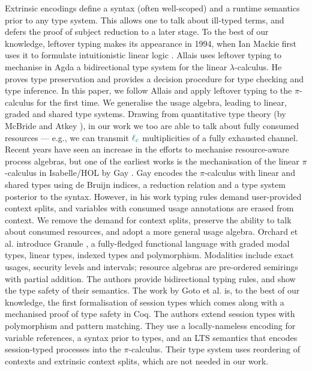 \documentclass[runningheads]{llncs}
\newcommand{\lambdacalc}{$\lambda$-calculus}
\newcommand{\picalc}{$\pi$-calculus}
\newcommand{\func}[1]{\textcolor{teal}{\operatorname{#1}}}
\newcommand{\lz}{\func{\ell_{\varepsilon}}}
\begin{document}
Extrinsic encodings define a syntax (often well-scoped) and a runtime semantics prior to any type system.
This allows one to talk about ill-typed terms, and defers the proof of subject reduction to a later stage.
%
To the best of our knowledge, leftover typing makes its appearance in 1994, when Ian Mackie first uses it to formulate intuitionistic linear logic \cite{Mackie}.
Allais \cite{Allais2018a} uses leftover typing to mechanise in Agda a bidirectional type system for the linear \lambdacalc{}.
He proves type preservation and provides a decision procedure for type checking and type inference.
In this paper, we follow Allais \cite{Allais2018a} and apply leftover typing to the \picalc{} for the first time.
We generalise the usage algebra, leading to linear, graded and shared type systems.
Drawing from quantitative type theory (by McBride and Atkey \cite{McBride2016,Atkey2018}), in our work we too are able to talk about fully consumed resources --- e.g., we can transmit $\lz$ multiplicities of a fully exhausted channel.
%
Recent years have seen an increase in the efforts to mechanise resource-aware process algebras, but one of the earliest works is the mechanisation of the linear \picalc{} in Isabelle/HOL by Gay \cite{Gay2001}.
Gay encodes the \picalc{} with linear and shared types using de Bruijn indices, a reduction relation and a type system posterior to the syntax.
However, in his work typing rules demand user-provided context splits, and variables with consumed usage annotations are erased from context.
We remove the demand for context splits, preserve the ability to talk about consumed resources, and adopt a more general usage algebra.
%
Orchard et al. introduce Granule \cite{Orchard}, a fully-fledged functional language with graded modal types, linear types, indexed types and polymorphism.
Modalities include exact usages, security levels and intervals; resource algebras are pre-ordered semirings with partial addition.
The authors provide bidirectional typing rules, and show the type safety of their semantics.
%
The work by Goto et al. \cite{Goto2016a} is, to the best of our knowledge, the first formalisation of session types which comes along with a mechanised proof of type safety in Coq.
The authors extend session types with polymorphism and pattern matching.
They use a locally-nameless encoding for variable references, a syntax prior to types, and an LTS semantics that encodes session-typed processes into the \picalc{}.
Their type system uses reordering of contexts and extrinsic context splits, which are not needed in our work. 
\end{document}
